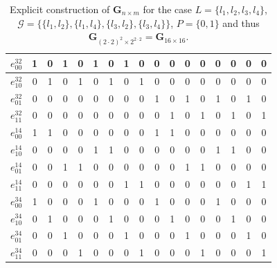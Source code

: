 \documentclass[10pt]{article}
\begin{document}
\begin{table}[!ht]
\begin{tabular}{ r || c | c | c | c | c | c | c | c | c | c | c | c | c | c | c | c }
    $e^{32}_{00}$ & 1 & 0 & 1 & 0 & 1 & 0 & 1 & 0 & 0 & 0 & 0 & 0 & 0 & 0 & 0 & 0\\ \hline
    $e^{32}_{10}$ & 0 & 1 & 0 & 1 & 0 & 1 & 0 & 1 & 0 & 0 & 0 & 0 & 0 & 0 & 0 & 0\\ \hline
    $e^{32}_{01}$ & 0 & 0 & 0 & 0 & 0 & 0 & 0 & 0 & 1 & 0 & 1 & 0 & 1 & 0 & 1 & 0\\ \hline
    $e^{32}_{11}$ & 0 & 0 & 0 & 0 & 0 & 0 & 0 & 0 & 0 & 1 & 0 & 1 & 0 & 1 & 0 & 1\\ \hline

    $e^{14}_{00}$ & 1 & 1 & 0 & 0 & 0 & 0 & 0 & 0 & 1 & 1 & 0 & 0 & 0 & 0 & 0 & 0\\ \hline
    $e^{14}_{10}$ & 0 & 0 & 0 & 0 & 1 & 1 & 0 & 0 & 0 & 0 & 0 & 0 & 1 & 1 & 0 & 0\\ \hline
    $e^{14}_{01}$ & 0 & 0 & 1 & 1 & 0 & 0 & 0 & 0 & 0 & 0 & 1 & 1 & 0 & 0 & 0 & 0\\ \hline
    $e^{14}_{11}$ & 0 & 0 & 0 & 0 & 0 & 0 & 1 & 1 & 0 & 0 & 0 & 0 & 0 & 0 & 1 & 1\\ \hline

    $e^{34}_{00}$ & 1 & 0 & 0 & 0 & 1 & 0 & 0 & 0 & 1 & 0 & 0 & 0 & 1 & 0 & 0 & 0\\ \hline
    $e^{34}_{10}$ & 0 & 1 & 0 & 0 & 0 & 1 & 0 & 0 & 0 & 1 & 0 & 0 & 0 & 1 & 0 & 0\\ \hline
    $e^{34}_{01}$ & 0 & 0 & 1 & 0 & 0 & 0 & 1 & 0 & 0 & 0 & 1 & 0 & 0 & 0 & 1 & 0\\ \hline
    $e^{34}_{11}$ & 0 & 0 & 0 & 1 & 0 & 0 & 0 & 1 & 0 & 0 & 0 & 1 & 0 & 0 & 0 & 1\\
    \end{tabular}
\caption{Explicit construction of $\mathbf{G}_{n \times m}$ for the case $L = \{ l_1,l_2,l_3,l_4 \}$, $\mathcal{G} = \{\{l_1,l_2 \},\{l_1,l_4 \},\{l_3,l_2\},\{l_3,l_4\} \}$, $P=\{0,1\}$ and thus $\mathbf{G}_{(2 \cdot 2)^2 \times 2^{2 \cdot 2}} = \mathbf{G}_{16 \times 16}$.}
\label{tab:logmat222}
\end{table}


\FloatBarrier
\pagebreak
\end{document}
